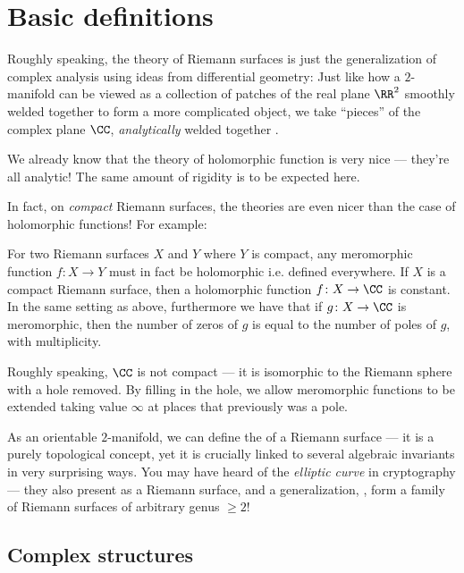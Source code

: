 \chapter{Basic definitions}
\label{ch:complex_structure_def}

Roughly speaking, the theory of Riemann surfaces is just the generalization of complex analysis
using ideas from differential geometry:
Just like how a $2$-manifold can be viewed as a collection of patches of the real plane $\RR^2$
smoothly welded together to form a more complicated object,
we take ``pieces'' of the complex plane $\CC$, \emph{analytically} welded together .

We already know that the theory of holomorphic function is very nice --- they're all analytic!
The same amount of rigidity is to be expected here.

In fact, on \emph{compact} Riemann surfaces, the theories are even nicer than the case of
holomorphic functions! For example:
\begin{itemize}
	\ii For two Riemann surfaces $X$ and $Y$ where $Y$ is compact, any meromorphic function $f
	\colon X \to Y$ must in fact be holomorphic i.e. defined everywhere.
	\ii If $X$ is a compact Riemann surface, then a holomorphic function $f \colon X \to \CC$ is
	constant.
	\ii In the same setting as above, furthermore we have that if $g \colon X \to \CC$ is
	meromorphic, then the number of zeros of $g$ is equal to the number of poles of $g$, with
	multiplicity.
\end{itemize}

\begin{remark}
Roughly speaking, $\CC$ is not compact --- it is isomorphic to the Riemann sphere with a hole
removed. By filling in the hole, we allow meromorphic functions to be extended taking value $\infty$
at places that previously was a pole.
\end{remark}

As an orientable $2$-manifold, we can define the  of a Riemann surface --- it is a
purely topological concept, yet it is crucially linked to several algebraic invariants
in very surprising ways.
You may have heard of the \emph{elliptic curve} in cryptography --- they also present as a Riemann
surface, and a generalization, , form a family of Riemann surfaces of
arbitrary genus $\geq 2$!

\section{Complex structures}

